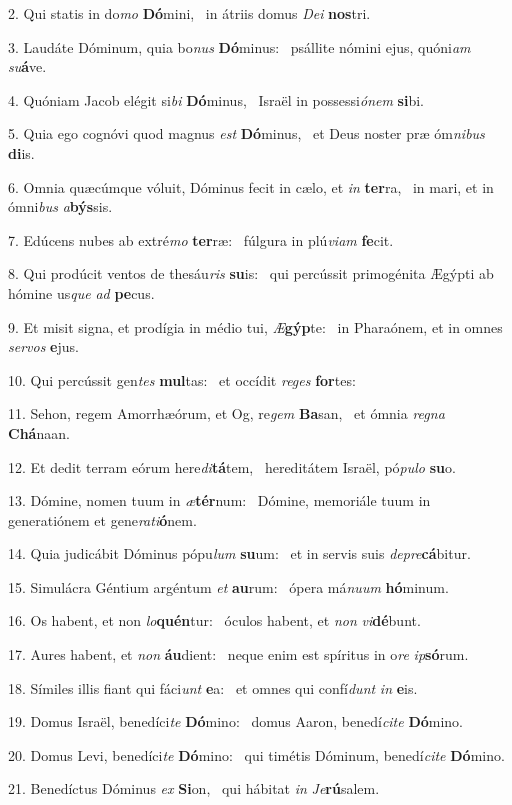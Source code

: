 2. Qui statis in do\textit{mo} \textbf{Dó}mini, \ast\  in átriis domus \textit{De}\textit{i} \textbf{nos}tri.\

3. Laudáte Dóminum, quia bo\textit{nus} \textbf{Dó}minus: \ast\  psállite nómini ejus, quóni\textit{am} \textit{su}\textbf{á}ve.\

4. Quóniam Jacob elégit si\textit{bi} \textbf{Dó}minus, \ast\  Israël in possessi\textit{ó}\textit{nem} \textbf{si}bi.\

5. Quia ego cognóvi quod magnus \textit{est} \textbf{Dó}minus, \ast\  et Deus noster præ óm\textit{ni}\textit{bus} \textbf{di}is.\

6. Omnia quæcúmque vóluit, Dóminus fecit in cælo, et \textit{in} \textbf{ter}ra, \ast\  in mari, et in ómni\textit{bus} \textit{a}\textbf{býs}sis.\

7. Edúcens nubes ab extré\textit{mo} \textbf{ter}ræ: \ast\  fúlgura in plú\textit{vi}\textit{am} \textbf{fe}cit.\

8. Qui prodúcit ventos de thesáu\textit{ris} \textbf{su}is: \ast\  qui percússit primogénita Ægýpti ab hómine us\textit{que} \textit{ad} \textbf{pe}cus.\

9. Et misit signa, et prodígia in médio tui, \textit{Æ}\textbf{gýp}te: \ast\  in Pharaónem, et in omnes \textit{ser}\textit{vos} \textbf{e}jus.\

10. Qui percússit gen\textit{tes} \textbf{mul}tas: \ast\  et occídit \textit{re}\textit{ges} \textbf{for}tes:\

11. Sehon, regem Amorrhæórum, et Og, re\textit{gem} \textbf{Ba}san, \ast\  et ómnia \textit{re}\textit{gna} \textbf{Chá}naan.\

12. Et dedit terram eórum here\textit{di}\textbf{tá}tem, \ast\  hereditátem Israël, pó\textit{pu}\textit{lo} \textbf{su}o.\

13. Dómine, nomen tuum in \textit{æ}\textbf{tér}num: \ast\  Dómine, memoriále tuum in generatiónem et gene\textit{ra}\textit{ti}\textbf{ó}nem.\

14. Quia judicábit Dóminus pópu\textit{lum} \textbf{su}um: \ast\  et in servis suis \textit{de}\textit{pre}\textbf{cá}bitur.\

15. Simulácra Géntium argéntum \textit{et} \textbf{au}rum: \ast\  ópera má\textit{nu}\textit{um} \textbf{hó}minum.\

16. Os habent, et non \textit{lo}\textbf{quén}tur: \ast\  óculos habent, et \textit{non} \textit{vi}\textbf{dé}bunt.\

17. Aures habent, et \textit{non} \textbf{áu}dient: \ast\  neque enim est spíritus in o\textit{re} \textit{ip}\textbf{só}rum.\

18. Símiles illis fiant qui fáci\textit{unt} \textbf{e}a: \ast\  et omnes qui confí\textit{dunt} \textit{in} \textbf{e}is.\

19. Domus Israël, benedíci\textit{te} \textbf{Dó}mino: \ast\  domus Aaron, benedí\textit{ci}\textit{te} \textbf{Dó}mino.\

20. Domus Levi, benedíci\textit{te} \textbf{Dó}mino: \ast\  qui timétis Dóminum, benedí\textit{ci}\textit{te} \textbf{Dó}mino.\

21. Benedíctus Dóminus \textit{ex} \textbf{Si}on, \ast\  qui hábitat \textit{in} \textit{Je}\textbf{rú}salem.\

